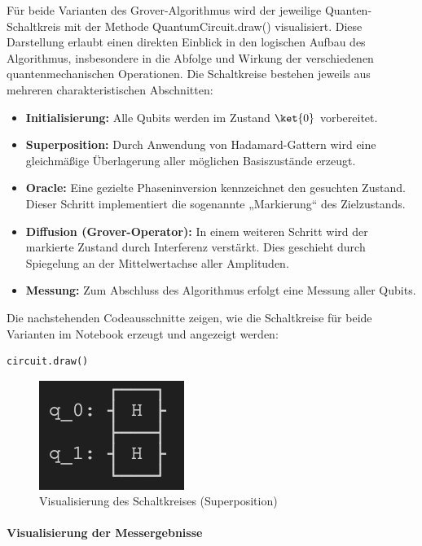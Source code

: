 Für beide Varianten des Grover-Algorithmus wird der jeweilige Quanten-Schaltkreis mit der Methode QuantumCircuit.draw() visualisiert. Diese Darstellung erlaubt einen direkten Einblick in den logischen Aufbau des Algorithmus, insbesondere in die Abfolge und Wirkung der verschiedenen quantenmechanischen Operationen. Die Schaltkreise bestehen jeweils aus mehreren charakteristischen Abschnitten:
\begin{itemize}
    \item \textbf{Initialisierung:} Alle Qubits werden im Zustand $\ket{0}$    vorbereitet.
    \item \textbf{Superposition:} Durch Anwendung von Hadamard-Gattern wird eine gleichmäßige Überlagerung aller möglichen Basiszustände erzeugt.
    \item \textbf{Oracle:} Eine gezielte Phaseninversion kennzeichnet den gesuchten Zustand. Dieser Schritt implementiert die sogenannte „Markierung“ des Zielzustands.
    \item \textbf{Diffusion (Grover-Operator):} In einem weiteren Schritt wird der markierte Zustand durch Interferenz verstärkt. Dies geschieht durch Spiegelung an der Mittelwertachse aller Amplituden.
    \item \textbf{Messung:} Zum Abschluss des Algorithmus erfolgt eine Messung aller Qubits.
\end{itemize}
\noindent
Die nachstehenden Codeausschnitte zeigen, wie die Schaltkreise für beide
Varianten im Notebook erzeugt und angezeigt werden:

\begin{verbatim}
circuit.draw()
\end{verbatim}

  \begin{figure}
      \includegraphics[width=0.25\linewidth]{circuit_superposition.png}
      \caption{Visualisierung des Schaltkreises (Superposition)}
      \label{fig:enter-label}
\end{figure}

\paragraph*{Visualisierung der Messergebnisse}
\mbox{}

